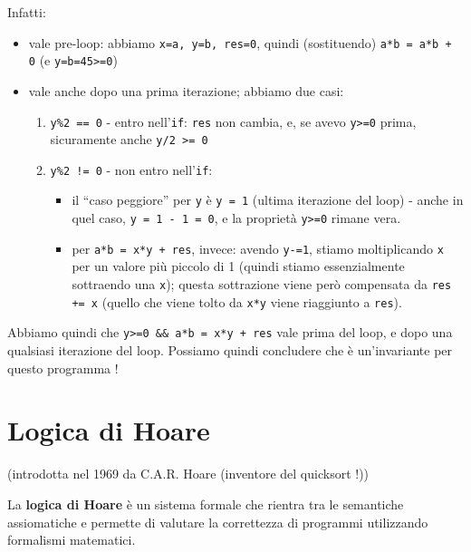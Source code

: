 \documentclass[a4paper,11pt]{report}
\begin{document}
Infatti:
\begin{itemize}
    \item vale pre-loop: 
        \subitem abbiamo \texttt{x=a, y=b, res=0}, quindi (sostituendo) \texttt{a*b = a*b + 0} (e \texttt{y=b=45>=0})
    \item vale anche dopo una prima iterazione; abbiamo due casi:
        \begin{enumerate}
            \item \texttt{y\%2 == 0} - entro nell'\texttt{if}:
                \subitem \texttt{res} non cambia, e, se avevo \texttt{y>=0} prima, sicuramente anche \texttt{y/2 >= 0}
            \item \texttt{y\%2 != 0} - non entro nell'\texttt{if}:
                \begin{itemize}
                    \item il ``caso peggiore'' per \texttt{y} è \texttt{y = 1} (ultima iterazione del loop) - anche in quel caso, \texttt{y = 1 - 1 = 0}, e la proprietà \texttt{y>=0} rimane vera.
                    \item per \texttt{a*b = x*y + res}, invece: avendo \texttt{y-=1}, stiamo moltiplicando \texttt{x} per un valore più piccolo di 1 (quindi stiamo essenzialmente sottraendo una \texttt{x}); questa sottrazione viene però compensata da \texttt{res += x} (quello che viene tolto da \texttt{x*y} viene riaggiunto a \texttt{res}).

                \end{itemize}
        \end{enumerate}

\end{itemize}

Abbiamo quindi che \texttt{y>=0 \&\& a*b = x*y + res} vale prima del loop, e dopo una qualsiasi iterazione del loop. Possiamo quindi concludere che è un'invariante per questo programma !

\section{Logica di Hoare}
(introdotta nel 1969 da C.A.R. Hoare (inventore del quicksort !))

La \textbf{logica di Hoare} è un sistema formale che rientra tra le semantiche assiomatiche e permette di valutare la correttezza di programmi utilizzando formalismi matematici.
\end{document}
